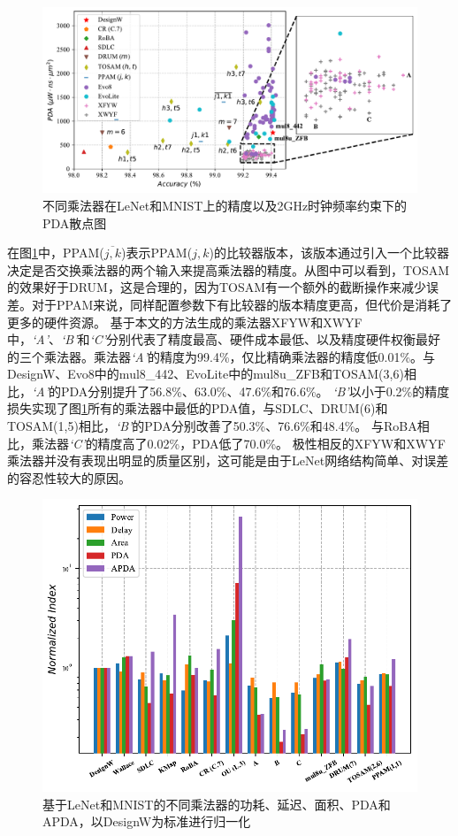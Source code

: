\begin{figure}[!h]
    \centering
    \includegraphics[width=\linewidth]{figs/AC-AM-Adapt-LeNet_PDA_accuracy.pdf}
    \caption{不同乘法器在LeNet和MNIST上的精度以及2GHz时钟频率约束下的PDA散点图}
    \label{AC:AM:Adapt:Fig:LeNet_PDA_accuracy}
\end{figure}

在图\ref{AC:AM:Adapt:Fig:LeNet_PDA_accuracy}中，PPAM($\overline{j,k}$)表示PPAM($j,k$)的比较器版本，该版本通过引入一个比较器决定是否交换乘法器的两个输入来提高乘法器的精度。从图中可以看到，TOSAM的效果好于DRUM，这是合理的，因为TOSAM有一个额外的截断操作来减少误差。对于PPAM来说，同样配置参数下有比较器的版本精度更高，但代价是消耗了更多的硬件资源。
基于本文的方法生成的乘法器XFYW和XWYF中，\emph{`A'}、\emph{`B'}和\emph{`C'}分别代表了精度最高、硬件成本最低、以及精度硬件权衡最好的三个乘法器。乘法器\emph{`A'}的精度为99.4\%，仅比精确乘法器的精度低0.01\%。与DesignW、Evo8中的mul8\_442、EvoLite中的mul8u\_ZFB和TOSAM(3,6)相比，\emph{`A'}的PDA分别提升了56.8\%、63.0\%、47.6\%和76.6\%。
\emph{`B'}以小于0.2\%的精度损失实现了图\ref{AC:AM:Adapt:Fig:LeNet_PDA_accuracy}所有的乘法器中最低的PDA值，与SDLC、DRUM(6)和TOSAM(1,5)相比，\emph{`B'}的PDA分别改善了50.3\%、76.6\%和48.4\%。
与RoBA相比，乘法器\emph{`C'}的精度高了0.02\%，PDA低了70.0\%。
极性相反的XFYW和XWYF乘法器并没有表现出明显的质量区别，这可能是由于LeNet网络结构简单、对误差的容忍性较大的原因。

\begin{figure}[!h]
    \centering
    \includegraphics[width=0.9\linewidth]{figs/AC-AM-Adapt-LeNet_hist.pdf}
    \caption{基于LeNet和MNIST的不同乘法器的功耗、延迟、面积、PDA和APDA，以DesignW为标准进行归一化}
    \label{AC:AM:Adapt:Fig:LeNet_hist}
\end{figure}


